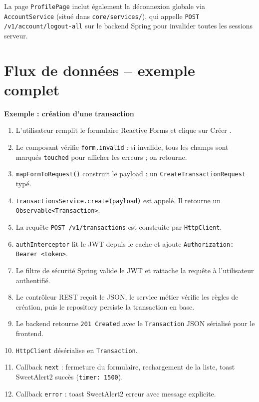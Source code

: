 \documentclass[12pt,a4paper]{article}
\begin{document}
La page \texttt{ProfilePage} inclut également la déconnexion globale via
\texttt{AccountService} (situé dans \texttt{core/services/}), qui appelle
\texttt{POST /v1/account/logout-all} sur le backend Spring pour invalider
toutes les sessions serveur.

\section{Flux de données -- exemple complet}

\begin{mdframed}[style=infobox]
\textbf{Exemple : création d'une transaction}
\end{mdframed}

\begin{enumerate}
  \item L'utilisateur remplit le formulaire Reactive Forms et clique sur \og Créer \fg.
  \item Le composant vérifie \texttt{form.invalid} : si invalide, tous les champs
        sont marqués \texttt{touched} pour afficher les erreurs ; on retourne.
  \item \texttt{mapFormToRequest()} construit le payload :
        un \texttt{CreateTransactionRequest} typé.
  \item \texttt{transactionsService.create(payload)} est appelé.
        Il retourne un \texttt{Observable<}\allowbreak\texttt{Transaction>}.
  \item La requête \texttt{POST /v1/transactions} est construite
        par \texttt{HttpClient}.
  \item \texttt{authInterceptor} lit le JWT depuis le cache et ajoute
        \texttt{Authorization: Bearer <token>}.
  \item Le filtre de sécurité Spring valide le JWT et rattache la requête à
        l'utilisateur authentifié.
  \item Le contrôleur REST reçoit le JSON, le service métier vérifie les règles
        de création, puis le repository persiste la transaction en base.
  \item Le backend retourne \texttt{201 Created} avec le \texttt{Transaction} JSON
        sérialisé pour le frontend.
  \item \texttt{HttpClient} désérialise en \texttt{Transaction}.
  \item Callback \texttt{next} : fermeture du formulaire, rechargement de la liste,
        toast SweetAlert2 succès (\texttt{timer: 1500}).
  \item Callback \texttt{error} : toast SweetAlert2 erreur avec message explicite.
\end{enumerate}
\end{document}
